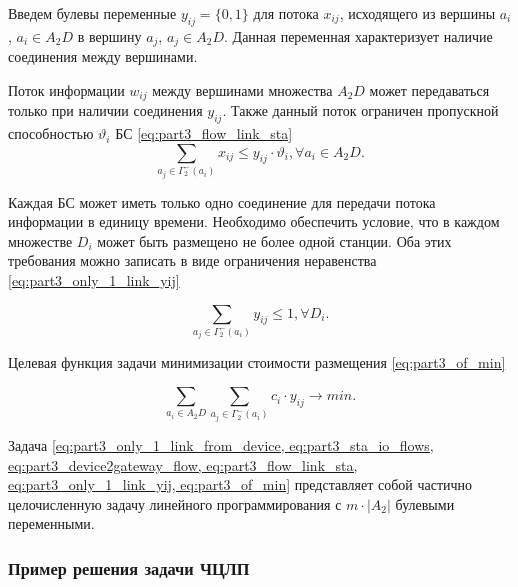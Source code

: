 Введем булевы переменные $y_{ij} = \{0,1\}$ для потока $x_{ij}$, исходящего из вершины $a_i$, $a_i \in A_2D$ в вершину $a_j$, $a_j \in A_2D$. Данная переменная характеризует наличие соединения между вершинами.

Поток информации $w_{ij}$ между вершинами множества $A_2D$ может передаваться только при наличии соединения $y_{ij}$. Также данный поток ограничен пропускной способностью $\vartheta_i$ БС  \cref{eq:part3_flow_link_sta}
\begin{equation}\label{eq:part3_flow_link_sta}
    \sum_{a_j \in \Gamma_2^-(a_i)} x_{ij} \leqslant y_{ij} \cdot \vartheta_i, \forall a_i \in A_2D.
\end{equation}

Каждая БС может иметь только одно соединение для передачи потока информации в единицу времени. Необходимо обеспечить условие, что в каждом множестве $D_i$ может быть размещено не более одной станции. Оба этих требования можно записать в виде ограничения неравенства \cref{eq:part3_only_1_link_yij}

\begin{equation}\label{eq:part3_only_1_link_yij}
    \sum_{a_j \in \Gamma_2^-(a_i)} y_{ij} \leqslant 1, \forall D_i.
\end{equation}

Целевая функция задачи минимизации стоимости размещения \cref{eq:part3_of_min}

\begin{equation}\label{eq:part3_of_min}
    \sum_{a_i \in A_2D} \sum_{a_j \in \Gamma_2^-(a_i)}c_i \cdot y_{ij} \to min.
\end{equation}

Задача \cref{eq:part3_only_1_link_from_device, eq:part3_sta_io_flows, eq:part3_device2gateway_flow, eq:part3_flow_link_sta, eq:part3_only_1_link_yij, eq:part3_of_min} представляет собой частично целочисленную задачу линейного программирования с $m \cdot |A_2|$ булевыми переменными. 

\subsubsection{Пример решения задачи ЧЦЛП}

